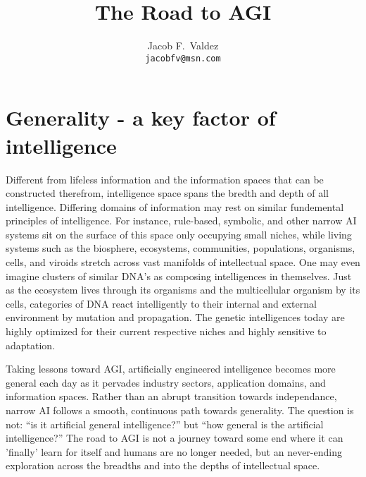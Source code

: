 \documentclass[twocolumn, switch]{article} %
\title{The Road to AGI}
\author{
  Jacob F.~Valdez \\
  \texttt{jacobfv@msn.com}
}
\begin{document}
\twocolumn[ %
  \begin{@twocolumnfalse} %
  
\maketitle

\begin{abstract}
\end{abstract}
\vspace{0.35cm}

  \end{@twocolumnfalse} %
] %



\linenumbers

\section{Generality - a key factor of intelligence}

Different from lifeless information and the information spaces that can be constructed therefrom, intelligence space spans the bredth and depth of all intelligence. Differing domains of information may rest on similar fundemental principles of intelligence. For instance, rule-based, symbolic, and other narrow AI systems sit on the surface of this space only occupying small niches, while living systems such as the biosphere, ecosystems, communities, populations, organisms, cells, and viroids stretch across vast manifolds of intellectual space. One may even imagine clusters of similar DNA's as composing intelligences in themselves. Just as the ecosystem lives through its organisms and the multicellular organism by its cells, categories of DNA react intelligently to their internal and external environment by mutation and propagation. The genetic intelligences today are highly optimized for their current respective niches and highly sensitive to adaptation.

Taking lessons toward AGI, artificially engineered intelligence becomes more general each day as it pervades industry sectors, application domains, and information spaces. Rather than an abrupt transition towards independance, narrow AI follows a smooth, continuous path towards generality. The question is not: ``is it artificial general intelligence?'' but ``how general is the artificial intelligence?'' The road to AGI is not a journey toward some end where it can 'finally' learn for itself and humans are no longer needed, but an never-ending exploration across the breadths and into the depths of intellectual space.
\end{document}
